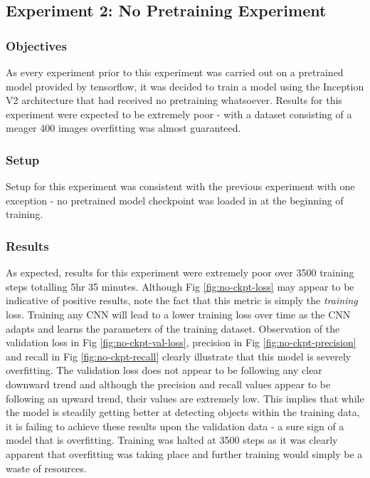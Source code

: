 \documentclass[12pt]{report}
\begin{document}
\clearpage
\subsection{Experiment 2: No Pretraining Experiment}
\subsubsection*{Objectives}
\begin{flushleft}
As every experiment prior to this experiment was carried out on a pretrained model provided by tensorflow, it was decided to train a model using the Inception V2 architecture that had received no pretraining whatsoever. Results for this experiment were expected to be extremely poor - with a dataset consisting of a meager 400 images overfitting was almost guaranteed.
\end{flushleft}

\subsubsection*{Setup}
\begin{flushleft}
Setup for this experiment was consistent with the previous experiment with one exception - no pretrained model checkpoint was loaded in at the beginning of training.
\end{flushleft}

\subsubsection*{Results}
\begin{flushleft}
As expected, results for this experiment were extremely poor over 3500 training steps totalling 5hr 35 minutes. Although Fig \ref{fig:no-ckpt-loss} may appear to be indicative of positive results, note the fact that this metric is simply the \textit{training} loss. Training any CNN will lead to a lower training loss over time as the CNN adapts and learns the parameters of the training dataset. Observation of the validation loss in Fig \ref{fig:no-ckpt-val-loss}, precision in Fig \ref{fig:no-ckpt-precision} and recall in Fig \ref{fig:no-ckpt-recall} clearly illustrate that this model is severely overfitting. The validation loss does not appear to be following any clear downward trend and although the precision and recall values appear to be following an upward trend, their values are extremely low. This implies that while the model is steadily getting better at detecting objects within the training data, it is failing to achieve these results upon the validation data - a sure sign of a model that is overfitting. Training was halted at 3500 steps as it was clearly apparent that overfitting was taking place and further training would simply be a waste of resources.
\end{flushleft}
\end{document}
